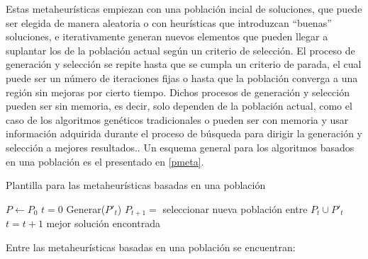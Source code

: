 Estas metaheurísticas empiezan con una población incial de soluciones, que puede ser elegida de manera aleatoria o con heurísticas que introduzcan ``buenas'' soluciones, e iterativamente generan nuevos elementos que pueden llegar a suplantar los de la población actual según un criterio de selección. El proceso de generación y selección se repite hasta que se cumpla un criterio de parada, el cual puede ser un número de iteraciones fijas o hasta que la población converga a una región sin mejoras por cierto tiempo. Dichos procesos de generación y selección pueden ser sin memoria, es decir, solo dependen de la población actual, como el caso de los algoritmos genéticos tradicionales o pueden ser con memoria y usar información adquirida durante el proceso de búsqueda para dirigir la generación y selección a mejores resultados.\cite{talbi2009metaheuristics}. Un esquema general para los algoritmos basados en una población es el presentado en \ref{pmeta}.

\begin{algorithm}
\caption{Plantilla para las metaheurísticas basadas en una población}
\label{pmeta}
\begin{algorithmic}[1]

\State $P \gets P_0$ 
\State $t=0$
\Repeat
	\State Generar($P'_t$) 
	\State $P_{t+1}=$ seleccionar nueva población entre $P_t \cup P'_t$
	\State $t=t+1$
\State \Return mejor solución encontrada

\end{algorithmic}
\end{algorithm}

Entre las metaheurísticas basadas en una población se encuentran:


